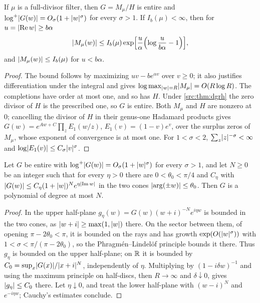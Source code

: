 \begin{lemma}\label{fil:lem:quotient}
If $\mu$ is a full-divisor filter, then $G=M_\mu/H$ is entire and $\log^+\lvert G(w)\rvert=O_\sigma(1+\lvert w\rvert^\sigma)$ for
every $\sigma>1$. If $I_b(\mu)<\infty$, then for $u=\lvert\operatorname{Re} w\rvert\ge b\alpha$
\begin{equation}\label{fil:eq:legendre}
 \lvert M_\mu(w)\rvert\le I_b(\mu)\exp\Bigl[\frac u\alpha\Bigl(\log\frac u{b\alpha}-1\Bigr)\Bigr],
\end{equation}
and $\lvert M_\mu(w)\rvert\le I_b(\mu)$ for $u<b\alpha$.
\end{lemma}

\begin{proof}
The bound follows by maximizing $uv-be^{\alpha v}$ over $v\ge0$; it also justifies differentiation under the
integral and gives $\log\max_{\lvert w\rvert=R}\lvert M_\mu\rvert=O(R\log R)$. The completions have order at most one, and so
has $H$. Under \cref{src:thm:dgrh} the zero divisor of $H$ is the prescribed one, so $G$ is entire. Both $M_\mu$
and $H$ are nonzero at $0$; cancelling the divisor of $H$ in their genus-one Hadamard products gives
$G(w)=e^{Aw+C}\prod_{z}E_1(w/z)$, $E_1(v)=(1-v)e^v$, over the surplus zeros of $M_\mu$, whose exponent of
convergence is at most one. For $1<\sigma<2$, $\sum_z\lvert z\rvert^{-\sigma}<\infty$ and $\log\lvert E_1(v)\rvert\le C_\sigma\lvert v\rvert^\sigma$.
\end{proof}

\begin{lemma}\label{fil:lem:cones}
Let $G$ be entire with $\log^+\lvert G(w)\rvert=O_\sigma(1+\lvert w\rvert^\sigma)$ for every $\sigma>1$, and let $N\ge0$ be an
integer such that for every $\eta>0$ there are $0<\theta_0<\pi/4$ and $C_\eta$ with
$\lvert G(w)\rvert\le C_\eta(1+\lvert w\rvert)^Ne^{\eta\lvert\operatorname{Im} w\rvert}$ in the two cones $\lvert\arg(\pm w)\rvert\le\theta_0$. Then $G$ is a
polynomial of degree at most $N$.
\end{lemma}

\begin{proof}
In the upper half-plane $g_\eta(w)=G(w)(w+i)^{-N}e^{i\eta w}$ is bounded in the two cones, as
$\lvert w+i\rvert\ge\max(1,\lvert w\rvert)$ there. On the sector between them, of opening $\pi-2\theta_0<\pi$, it is bounded on the
rays and has growth $\exp(O(\lvert w\rvert^\sigma))$ with $1<\sigma<\pi/(\pi-2\theta_0)$, so the Phragm\'en--Lindel\"of
principle \cite{Boas1954Entire} bounds it there. Thus $g_\eta$ is bounded on the upper half-plane; on $\mathbb{R}$ it is bounded by
$C_0=\sup_x\lvert G(x)\rvert/\lvert x+i\rvert^N$, independently of $\eta$. Multiplying by $(1-i\delta w)^{-1}$ and using the
maximum principle on half-discs, then $R\to\infty$ and $\delta\downarrow0$, gives $\lvert g_\eta\rvert\le C_0$ there. Let
$\eta\downarrow0$, and treat the lower half-plane with $(w-i)^N$ and $e^{-i\eta w}$; Cauchy's estimates conclude.
\end{proof}

